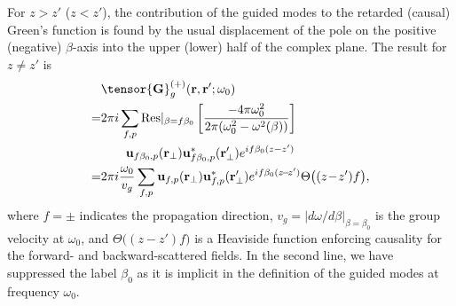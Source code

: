 \documentclass[aps,pra,twocolumn]{revtex4-1} %
\begin{document}
For $z>z'$ ($z<z'$), the contribution of the guided modes to the retarded (causal) Green's function is found by the 
usual displacement of the pole on the positive (negative) $\beta$-axis into the upper (lower) half of 
the complex plane. The result for $z \neq z'$ is \cite{manga_rao_single_2007}
	\begin{align} 
		&\tensor{\mathbf{G}}^{(+)}_g(\br,\br'; \omega_0) \nn\\
		=& 2\pi i \sum_{f,p}  {\rm Res}\vert_{\beta =f\beta_0} 
\left[\frac{-4\pi \omega_0^2 }{2\pi ( \omega_0^2-\omega^2(\beta))}\right] \nn\\ &\quad\quad \mathbf{u}_{f\beta_0, p} 
(\br_\perp)\mathbf{u}^*_{f\beta_0, p} (\br_{\perp}^\prime)e^{if \beta_0 (z-z')} \nonumber \\
= & 2\pi i \frac{\omega_0}{v_g } \sum_{f,p} \mathbf{u}_{f, p} (\br_\perp)\mathbf{u}^*_{f , p} 
(\br_{\perp}^\prime) e^{i f \beta_0(z\!-\!z')} \Theta \big( (z\!-\!z')f \big), \label{Eq::GreensGuided}
	\end{align}
where $f=\pm$ indicates the propagation direction, $v_g= \vert d\omega/d\beta \vert_{\beta=\beta_0}$ is the group velocity at $\omega_0$, and $\Theta \big( (z-z')f \big)$ is a Heaviside function enforcing causality for the forward- and backward-scattered fields. In the second line, we have suppressed the label $\beta_0$ as it is implicit in the definition of the guided modes at frequency $\omega_0$. 
\end{document}
